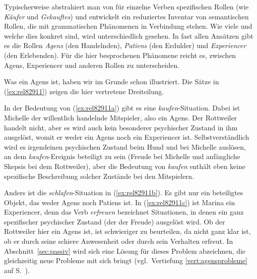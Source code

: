 Typischerweise abstrahiert man von für einzelne Verben spezifischen Rollen (wie \textit{Käufer} und \textit{Gekauftes}) und entwickelt ein reduziertes Inventar von semantischen Rollen, die mit grammatischen Phänomenen in Verbindung stehen.
Wie viele und welche dies konkret sind, wird unterschiedlich gesehen.
In fast allen Ansätzen gibt es die Rollen \textit{Agens} (den Handelnden), \textit{Patiens} (den Erdulder) und \textit{Experiencer} (den Erlebenden).
Für die hier besprochenen Phänomene reicht es, zwischen Agens, Experiencer und anderen Rollen zu unterscheiden.

Was ein Agens ist, haben wir im Grunde schon illustriert.
Die Sätze in (\ref{ex:rel82911}) zeigen die hier vertretene Dreiteilung.

\begin{exe}
  \ex\label{ex:rel82911} 
  \begin{xlist}
  \end{xlist}
\end{exe}

In der Bedeutung von (\ref{ex:rel82911a}) gibt es eine \textit{kaufen}-Situation.
Dabei ist Michelle der willentlich handelnde Mitspieler, also ein Agens.
Der Rottweiler handelt nicht, aber es wird auch kein besonderer psychischer Zustand in ihm ausgelöst, womit er weder ein Agens noch ein Experiencer ist.
Selbstverständlich wird es irgendeinen psychischen Zustand beim Hund und bei Michelle auslösen, an dem \textit{kaufen}-Ereignis beteiligt zu sein (\zB Freude bei Michelle und anfängliche Skepsis bei dem Rottweiler), aber die Bedeutung von \textit{kaufen} enthält eben keine spezifische Beschreibung solcher Zustände bei den Mitspielern.

Anders ist die \textit{schlafen}-Situation in (\ref{ex:rel82911b}).
Es gibt nur ein beteiligtes Objekt, das weder Agens noch Patiens ist.
In (\ref{ex:rel82911c}) ist Marina ein Experiencer, denn das Verb \textit{erfreuen} bezeichnet Situationen, in denen ein ganz spezifischer psychischer Zustand (der der Freude) ausgelöst wird.
Ob der Rottweiler hier ein Agens ist, ist schwieriger zu beurteilen, da nicht ganz klar ist, ob er durch seine schiere Anwesenheit oder durch sein Verhalten erfreut.
In Abschnitt~\ref{sec:passiv} wird sich eine Lösung für dieses Problem abzeichnen, die gleichzeitig neue Probleme mit sich bringt (vgl.\ Vertiefung \ref{vert:agensprobleme} auf S.~\pageref{vert:agensprobleme}).

